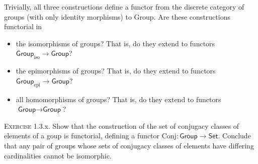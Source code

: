 \documentclass{article}
\newcommand{\cat}[1]{\textsf{#1}}
\begin{document}
Trivially, all three constructions define a functor from the discrete category of groups (with only identity morphisms) to \cat{Group}. Are these constructions functorial in 
\begin{itemize}
    \item the isomorphisms of groups? That is, do they extend to functors $\cat{Group}_{\text{iso}} \to \cat{Group}$? 
    \item the epimorphisms of groups? That is, do they extend to functors $\cat{Group}_{\text{epi}} \to \cat{Group}$? 
    \item all homomorphisms of groups? That is, do they extend to functors $\cat{Group} \to \cat{Group}$?
\end{itemize}
\textsc{Exercise} 1.3.x. Show that the construction of the set of conjugacy classes of elements of a goup is functorial, defining a functor $\text{Conj}: \cat{Group} \to \cat{Set}$. Conclude that any pair of groups whose sets of conjugacy classes of elements have differing cardinalities cannot be isomorphic.
    
 
\end{document}
